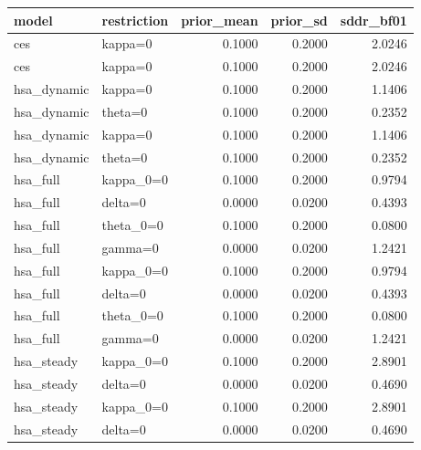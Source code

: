 \begin{tabular}{llrrr}
\toprule
model & restriction & prior\_mean & prior\_sd & sddr\_bf01 \\
\midrule
ces & kappa=0 & 0.1000 & 0.2000 & 2.0246 \\
ces & kappa=0 & 0.1000 & 0.2000 & 2.0246 \\
hsa\_dynamic & kappa=0 & 0.1000 & 0.2000 & 1.1406 \\
hsa\_dynamic & theta=0 & 0.1000 & 0.2000 & 0.2352 \\
hsa\_dynamic & kappa=0 & 0.1000 & 0.2000 & 1.1406 \\
hsa\_dynamic & theta=0 & 0.1000 & 0.2000 & 0.2352 \\
hsa\_full & kappa\_0=0 & 0.1000 & 0.2000 & 0.9794 \\
hsa\_full & delta=0 & 0.0000 & 0.0200 & 0.4393 \\
hsa\_full & theta\_0=0 & 0.1000 & 0.2000 & 0.0800 \\
hsa\_full & gamma=0 & 0.0000 & 0.0200 & 1.2421 \\
hsa\_full & kappa\_0=0 & 0.1000 & 0.2000 & 0.9794 \\
hsa\_full & delta=0 & 0.0000 & 0.0200 & 0.4393 \\
hsa\_full & theta\_0=0 & 0.1000 & 0.2000 & 0.0800 \\
hsa\_full & gamma=0 & 0.0000 & 0.0200 & 1.2421 \\
hsa\_steady & kappa\_0=0 & 0.1000 & 0.2000 & 2.8901 \\
hsa\_steady & delta=0 & 0.0000 & 0.0200 & 0.4690 \\
hsa\_steady & kappa\_0=0 & 0.1000 & 0.2000 & 2.8901 \\
hsa\_steady & delta=0 & 0.0000 & 0.0200 & 0.4690 \\
\bottomrule
\end{tabular}
